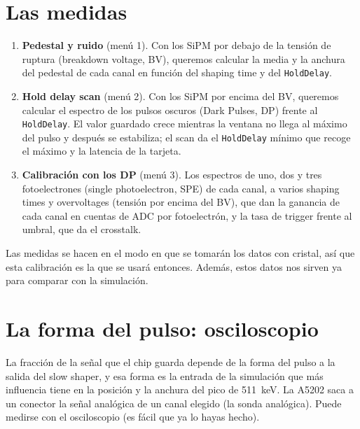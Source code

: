 \documentclass[11pt,a4paper]{article}
\begin{document}
\section*{Las medidas}

\begin{enumerate}
\item {\bf Pedestal y ruido} (menú 1). Con los SiPM por debajo de la tensión
  de ruptura (breakdown voltage, BV), queremos calcular la media y la anchura del pedestal de
  cada canal en función del shaping time y del \texttt{HoldDelay}.
\item {\bf Hold delay scan} (menú 2). Con los SiPM por encima del BV, queremos calcular el
  espectro de los pulsos oscuros (Dark Pulses, DP) frente al \texttt{HoldDelay}. El
  valor guardado crece mientras la ventana no llega al máximo del
  pulso y después se estabiliza; el scan da el \texttt{HoldDelay} mínimo que
  recoge el máximo y la latencia de la tarjeta.
\item {\bf Calibración con los DP} (menú 3). Los espectros de
  uno, dos y tres fotoelectrones (single photoelectron, SPE) de cada canal,
  a varios shaping times y overvoltages (tensión por encima del BV), que dan
  la ganancia de cada canal en cuentas de ADC por fotoelectrón, y la tasa de
  trigger frente al umbral, que da el crosstalk.
\end{enumerate}

\noindent Las medidas se hacen en el modo en que se tomarán los datos con
cristal, así que esta calibración es la que se usará entonces. Además, estos
datos nos sirven ya para comparar con la simulación.

\section*{La forma del pulso: osciloscopio}

La fracción de la señal que el chip guarda depende de la forma del pulso a
la salida del slow shaper, y esa forma es la entrada de la simulación que
más influencia tiene en la posición y la anchura del pico de 511~keV. La A5202 saca a
un conector la señal analógica de un canal elegido (la sonda analógica). Puede medirse con el osciloscopio (es fácil que ya lo hayas hecho).
\end{document}
